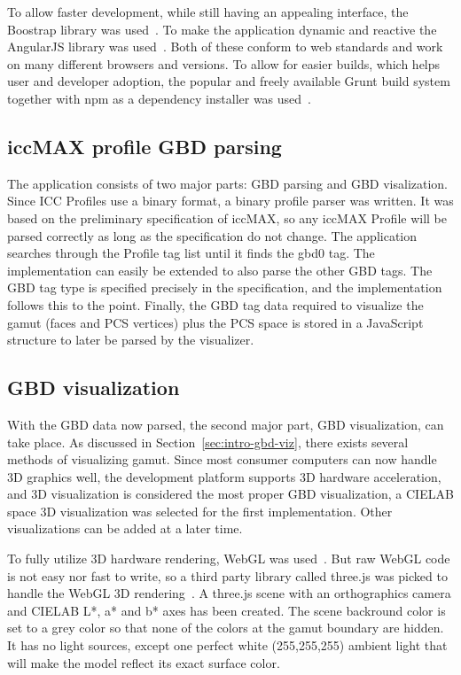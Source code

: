 To allow faster development, while still having an appealing interface, the Boostrap library was used~\cite{Bootstrap}.
To make the application dynamic and reactive the AngularJS library was used~\cite{Angular}.
Both of these conform to web standards and work on many different browsers and versions.
To allow for easier builds, which helps user and developer adoption, the popular and freely available Grunt build system together with npm as a dependency installer was used~\cite{Grunt,Npm}.

\subsection{iccMAX profile GBD parsing}
The application consists of two major parts: GBD parsing and GBD visalization.
Since ICC Profiles use a binary format, a binary profile parser was written.
It was based on the preliminary specification of iccMAX, so any iccMAX Profile will be parsed correctly as long as the specification do not change.
The application searches through the Profile tag list until it finds the gbd0 tag.
The implementation can easily be extended to also parse the other GBD tags.
The GBD tag type is specified precisely in the specification, and the implementation follows this to the point.
Finally, the GBD tag data required to visualize the gamut (faces and PCS vertices) plus the PCS space is stored in a JavaScript structure to later be parsed by the visualizer.

\subsection{GBD visualization}
With the GBD data now parsed, the second major part, GBD visualization, can take place.
As discussed in Section~\ref{sec:intro-gbd-viz}, there exists several methods of visualizing gamut.
Since most consumer computers can now handle 3D graphics well, the development platform supports 3D hardware acceleration, and 3D visualization is considered the most proper GBD visualization, a CIELAB space 3D visualization was selected for the first implementation.
Other visualizations can be added at a later time.

To fully utilize 3D hardware rendering, WebGL was used~\cite{WebGl}.
But raw WebGL code is not easy nor fast to write, so a third party library called three.js was picked to handle the WebGL 3D rendering~\cite{ThreeJs}.
A three.js scene with an orthographics camera and CIELAB L*, a* and b* axes has been created.
The scene backround color is set to a grey color so that none of the colors at the gamut boundary are hidden.
It has no light sources, except one perfect white (255,255,255) ambient light that will make the model reflect its exact surface color.

